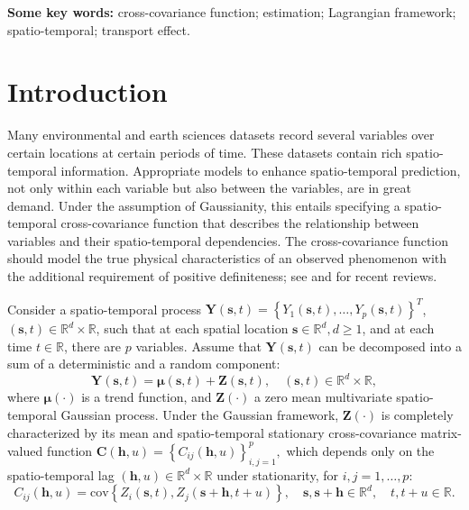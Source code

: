 \documentclass[12pt]{article}
\newcommand{\0}{\mathbf{0}}
\begin{document}
\par\vfill\noindent
{\bf Some key words:} cross-covariance function; estimation; Lagrangian framework; spatio-temporal;  transport effect.

\clearpage\pagebreak\newpage {}
\baselineskip=26pt


\section{Introduction}\label{sec:intro}

Many environmental and earth sciences datasets record several variables over certain locations at certain periods of time. These datasets contain rich spatio-temporal information. Appropriate models to enhance spatio-temporal prediction, not only within each variable but also between the variables, are in great demand. Under the assumption of Gaussianity, this entails specifying a spatio-temporal cross-covariance function that describes the relationship between variables and their spatio-temporal dependencies. The cross-covariance function should model the true physical characteristics of an observed phenomenon with the additional requirement of positive definiteness; see \cite{genton2015cross} and \cite{alegria2017covariance} for recent reviews. 

Consider a spatio-temporal process 
$\mathbf{Y}(\mathbf{s},t)=\left\{Y_1(\mathbf{s},t),\ldots,Y_p(\mathbf{s},t)\right\}^T$, $(\mathbf{s},t)\in  \mathbb{R}^d \times \mathbb{R}$,
such that at each spatial location $\mathbf{s} \in \mathbb{R}^d, d\geq 1$, and at each time $t\in\mathbb{R}$, there are $p$ variables. Assume that $\mathbf{Y}(\mathbf{s},t)$ can be decomposed into a sum of a deterministic and a random component:
\begin{equation*}
\mathbf{Y}(\mathbf{s},t) =\boldsymbol{\mu}(\mathbf{s},t)+\mathbf{Z}(\mathbf{s},t),\quad (\mathbf{s},t)\in \mathbb{R}^d\times \mathbb{R},
\end{equation*}
where $\boldsymbol{\mu}(\cdot)$ is a trend function, and $\mathbf{Z}(\cdot)$ a zero mean multivariate spatio-temporal Gaussian process. Under the Gaussian framework, $\mathbf{Z}(\cdot)$ is completely characterized by its mean and spatio-temporal stationary cross-covariance matrix-valued function $\mathbf{C}(\mathbf{h},u)=\left\{C_{ij}(\mathbf{h},u)\right\}_{i,j=1}^{p},$ which depends only on the spatio-temporal lag $(\mathbf{h},u)\in \mathbb{R}^d\times \mathbb{R}$ under stationarity, for $i,j=1,\ldots,p$:
\begin{equation} \label{eqn:stationarity}
C_{ij}(\mathbf{h},u)=\text{cov}\left\{Z_i(\mathbf{s},t),Z_j(\mathbf{s}+\mathbf{h},t+u)\right\},\quad \mathbf{s},\mathbf{s}+\mathbf{h}\in \mathbb{R}^d, \quad t,t+u\in \mathbb{R}.
\end{equation}
\end{document}
